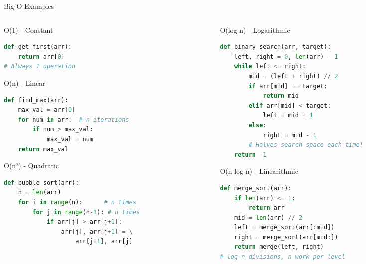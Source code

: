 \documentclass[aspectratio=169,xcolor=dvipsnames]{beamer}
\begin{document}
\begin{frame}[fragile]{Big-O Examples}
  \begin{columns}
    \begin{column}{0.48\textwidth}
      \begin{exampleblock}{O(1) - Constant}
        \begin{lstlisting}[language=Python,basicstyle=\tiny\ttfamily]
def get_first(arr):
    return arr[0]
# Always 1 operation
        \end{lstlisting}
      \end{exampleblock}

      \begin{exampleblock}{O(n) - Linear}
        \begin{lstlisting}[language=Python,basicstyle=\tiny\ttfamily]
def find_max(arr):
    max_val = arr[0]
    for num in arr:  # n iterations
        if num > max_val:
            max_val = num
    return max_val
        \end{lstlisting}
      \end{exampleblock}

      \begin{exampleblock}{O(n²) - Quadratic}
        \begin{lstlisting}[language=Python,basicstyle=\tiny\ttfamily]
def bubble_sort(arr):
    n = len(arr)
    for i in range(n):      # n times
        for j in range(n-1): # n times
            if arr[j] > arr[j+1]:
                arr[j], arr[j+1] = \
                    arr[j+1], arr[j]
        \end{lstlisting}
      \end{exampleblock}
    \end{column}
    \begin{column}{0.48\textwidth}
      \begin{exampleblock}{O(log n) - Logarithmic}
        \begin{lstlisting}[language=Python,basicstyle=\tiny\ttfamily]
def binary_search(arr, target):
    left, right = 0, len(arr) - 1
    while left <= right:
        mid = (left + right) // 2
        if arr[mid] == target:
            return mid
        elif arr[mid] < target:
            left = mid + 1
        else:
            right = mid - 1
        # Halves search space each time!
    return -1
        \end{lstlisting}
      \end{exampleblock}

      \begin{exampleblock}{O(n log n) - Linearithmic}
        \begin{lstlisting}[language=Python,basicstyle=\tiny\ttfamily]
def merge_sort(arr):
    if len(arr) <= 1:
        return arr
    mid = len(arr) // 2
    left = merge_sort(arr[:mid])
    right = merge_sort(arr[mid:])
    return merge(left, right)
# log n divisions, n work per level
        \end{lstlisting}
      \end{exampleblock}
    \end{column}
  \end{columns}
\end{frame}
\end{document}
